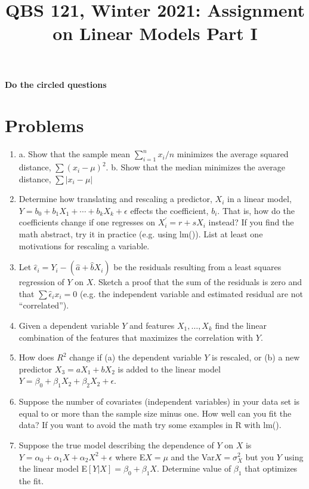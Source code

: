\documentclass[11pt]{article}
\begin{document}
\title{QBS 121, Winter 2021: Assignment  on Linear Models Part I}

\maketitle

\pagestyle{headings}

{\bf Do the circled questions}

\section{Problems}

\begin{enumerate}

\item a. Show that the sample mean $\sum_{i=1}^n x_i/n$ minimizes the average squared distance, $\sum (x_i - \mu)^2$. b. Show that the median minimizes the average distance, $\sum |x_i - \mu|$

\item Determine how translating and rescaling a predictor, $X_i$ in a linear model, $Y=b_0+b_1X_1+\cdots+b_kX_k+\epsilon$ effects the coefficient, $b_i$. That is, how do the coefficients change if one regresses on $X_i^{\prime}=r+sX_i$ instead? If you find the math abstract, try it in practice (e.g. using lm()). List at least one motivations for rescaling a variable.

\item Let ${\hat \epsilon}_i = Y_i - ({\hat a}+ {\hat b}X_i)$ be the residuals resulting from a least squares regression of $Y$ on $X$. Sketch a proof that the sum of the residuals is zero and that $\sum {\hat \epsilon}_i x_i = 0$ (e.g. the independent variable and estimated residual are not ``correlated'').

\item Given a dependent variable $Y$ and features $X_1,\ldots,X_k$ find the linear combination of the features that maximizes the correlation with $Y$.

\item How does $R^2$ change if (a) the dependent variable $Y$ is rescaled, or (b) a new predictor $X_3=aX_1+bX_2$ is added to the linear model $Y=\beta_0 + \beta_1 X_2 + \beta_2 X_2 + \epsilon$. 

\item Suppose the number of covariates (independent variables) in your data set is equal to or more than the sample size minus one. How well can you fit the data? If you want to avoid the math try some examples in R with lm().

\item Suppose the true model describing the dependence of $Y$ on $X$ is $Y=\alpha_0 + \alpha_1 X + \alpha_2 X^2 + \epsilon$ where E$X=\mu$ and the Var$X=\sigma_X^2$ but you $Y$ using the linear model E$[Y|X]=\beta_0+\beta_1 X$. Determine value of $\beta_1$ that optimizes the fit.

\end{enumerate}
\end{document}
